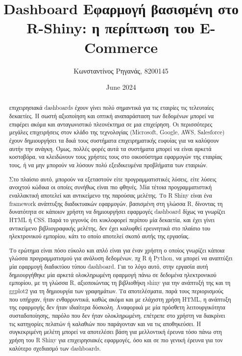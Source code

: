 \documentclass[greek, 12pt]{article}
\title{Dashboard Εφαρμογή βασισμένη στο R-Shiny: η περίπτωση του E-Commerce}
\author{Κωνσταντίνος Ρηγανάς, 8200145}
\date{June 2024}
\begin{document}


\newpage

\tableofcontents

\newpage

\begin{abstract}
     επιχειρησιακά dashboards έχουν γίνει πολύ σημαντικά για τις εταιρίες τις τελευταίες δεκαετίες. Η σωστή αξιοποίηση και οπτική αναπαράσταση των δεδομένων μπορεί να επιφέρει ακόμα και ανταγωνιστικό πλεονέκτημα σε μια επιχείρηση. Οι περισσότερες μεγάλες επιχειρήσεις στον κλάδο της τεχνολογίας (Microsoft, Google, AWS, Salesforce) έχουν δημιουργήσει τα δικά τους συστήματα επιχειρηματικής ευφυίας για να καλύψουν αυτήν την ανάγκη. Όμως, πολλές φορές αυτά τα συστήματα μπορεί να είναι αρκετά κοστοβόρα, να κλειδώνουν τους χρήστες τους στο οικοσύστημα εφαρμογών της εταιρίας τους, ή να μην μπορούν να λύσουν πολύ εξειδικευμένα προβλήματα των εταιριών.
    
    Στο πλαίσιο αυτό, μπορούν να εξεταστούν είτε προγραμματιστικές λύσεις, είτε λύσεις ανοιχτού κώδικα οι οποίες συνήθως είναι πιο φθηνές. Μία τέτοια προγραμματιστική εναλλακτική αποτελεί και αντικείμενο της παρούσας μελέτης. Το R Shiny είναι ένα framework ανάπτυξης διαδικτυακών εφαρμογών, βασισμένη στη γλώσσα R, δίνοντας τη δυνατότητα σε κάποιον χρήστη να δημιουργήσει εφαρμογές dashboard δίχως να γνωρίζει HTML ή CSS. Παρά το γεγονός ότι κυκλοφορεί περίπου μία δεκαετία, και έχει γίνει αντικείμενο βιβλιογραφικής μελέτης, δεν έχει καλυφθεί ερευνητικά στο πλαίσιο του ηλεκτρονικού εμπορίου, κάτι το οποίο αποτελεί σκοπό αυτής της εργασίας.

    Το ερώτημα είναι πόσο εύκολο και απλό είναι για έναν χρήστη ο οποίος γνωρίζει κάποια γλώσσα προγραμματισμού για ανάλυση δεδομένων, πχ R ή Python, να μπορεί να αναπτύξει μία εφαρμογή διαδικτύου τύπου dashboard. Για το λόγο αυτό, στην εργασία αυτή δημιουργήθηκε μία αρκετά ολοκληρωμένη εφαρμογή πάνω σε δεδομένα ηλεκτρονικού εμπορίου, με τη γλώσσα R, αξιοποιώντας τη βιβλιοθήκη shiny για την ανάπτυξή της και τη ggplot2 για τη δημιουργία των γραφημάτων. Τα αποτελέσματα, παρά τους περιορισμούς που υπήρχαν, ήταν ενθαρρυντικά, καθώς ακόμα και με ελάχιστη χρήση HTML, η ανάπτυξη της εφαρμογής δεν ήταν ιδιαίτερα δύσκολη. Αναφορικά με μία πρόσθετη λειτουργικότητα συσταδοποίησης, παρόλο που δεν ήταν ολοκληρωμένη, επέτρεπε στο χρήστη να διακρίνει τις κατηγορίες πελατών ή καλαθιών που παράγονταν και να τις αποθηκεύσει. Η συγκεκριμένη μελέτη μπορεί να αποτελέσει βάση για μελλοντική έρευνα τόσο  πάνω στη χρήση του R Shiny για επιχειρησιακές εφαρμογές, όσο και σε πιο γενική έρευνα για τον καλύτερο σχεδιασμό των dashboards.

\end{abstract}
\end{document}
